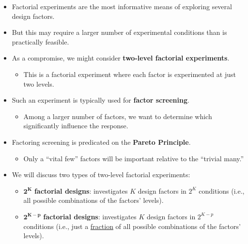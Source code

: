 \begin{itemize}
      \item Factorial experiments are the most informative means of exploring several design factors.
      \item But this may require a larger number of experimental conditions than is practically feasible.
      \item As a compromise, we might consider \textbf{two-level factorial experiments}.
            \begin{itemize}
                  \item This is a factorial experiment where each factor is experimented at just two levels.
            \end{itemize}
      \item Such an experiment is typically used for \textbf{factor screening}.
            \begin{itemize}
                  \item Among a larger number of factors, we want to determine which significantly influence the response.
            \end{itemize}
      \item Factoring screening is predicated on the \textbf{Pareto Principle}.
            \begin{itemize}
                  \item Only a ``vital few'' factors will be important relative to the ``trivial many.''
            \end{itemize}
      \item We will discuss two types of two-level factorial experiments:
            \begin{itemize}
                  \item $ \symbf{2^K} $ \textbf{factorial designs}: investigates $ K $ design factors in $ 2^K $ conditions (i.e., all possible combinations of the factors' levels).
                  \item $ \symbf{2^{K-p}} $ \textbf{factorial designs}: investigates $ K $ design factors in $ 2^{K-p} $ conditions (i.e., just a \underline{fraction} of all possible
                        combinations of the factors' levels).
            \end{itemize}
\end{itemize}
